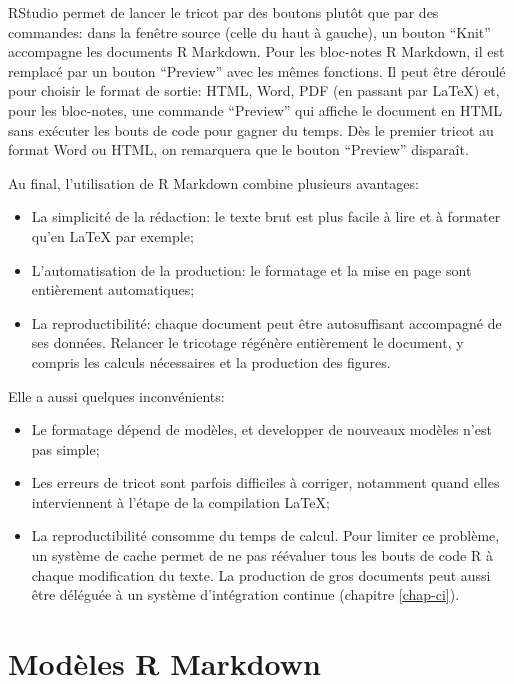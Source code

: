 \documentclass[
  12pt,
  french,
  a4paper,
  extrafontsizes,onecolumn,openright
  ]{memoir}
\providecommand{\tightlist}{%
  \setlength{\itemsep}{0pt}\setlength{\parskip}{0pt}}
\newlength{\rf}
\begin{document}
RStudio permet de lancer le tricot par des boutons plutôt que par des commandes: dans la fenêtre source (celle du haut à gauche), un bouton \enquote{Knit} accompagne les documents R Markdown.
Pour les bloc-notes R Markdown, il est remplacé par un bouton \enquote{Preview} avec les mêmes fonctions.
Il peut être déroulé pour choisir le format de sortie: HTML, Word, PDF (en passant par LaTeX) et, pour les bloc-notes, une commande \enquote{Preview} qui affiche le document en HTML sans exécuter les bouts de code pour gagner du temps.
Dès le premier tricot au format Word ou HTML, on remarquera que le bouton \enquote{Preview} disparaît.

Au final, l'utilisation de R Markdown combine plusieurs avantages:

\begin{itemize}
\tightlist
\item
  La simplicité de la rédaction: le texte brut est plus facile à lire et à formater qu'en LaTeX par exemple;
\item
  L'automatisation de la production: le formatage et la mise en page sont entièrement automatiques;
\item
  La reproductibilité: chaque document peut être autosuffisant accompagné de ses données. Relancer le tricotage régénère entièrement le document, y compris les calculs nécessaires et la production des figures.
\end{itemize}

Elle a aussi quelques inconvénients:

\begin{itemize}
\tightlist
\item
  Le formatage dépend de modèles, et developper de nouveaux modèles n'est pas simple;
\item
  Les erreurs de tricot sont parfois difficiles à corriger, notamment quand elles interviennent à l'étape de la compilation LaTeX;
\item
  La reproductibilité consomme du temps de calcul. Pour limiter ce problème, un système de cache permet de ne pas réévaluer tous les bouts de code R à chaque modification du texte. La production de gros documents peut aussi être déléguée à un système d'intégration continue (chapitre \ref{chap-ci}).
\end{itemize}

\section{Modèles R Markdown}\label{moduxe8les-r-markdown}
\end{document}
